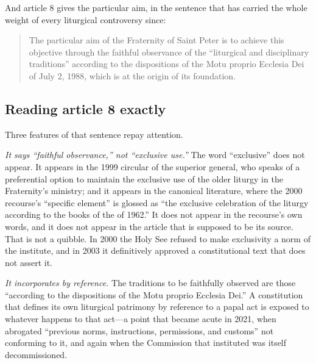 And article 8 gives the particular aim, in the sentence that has carried
the whole weight of every liturgical controversy since:

\begin{quote}\small
The particular aim of the Fraternity of Saint Peter is to achieve this
objective through the faithful observance of the ``liturgical and
disciplinary traditions'' according to the dispositions of the Motu
proprio Ecclesia Dei of July 2, 1988, which is at the origin of its
foundation.
\end{quote}

\subsection{Reading article 8 exactly}

Three features of that sentence repay attention.

\emph{It says ``faithful observance,'' not ``exclusive use.''} The word
``exclusive'' does not appear. It appears in the 1999 circular of the
superior general, who speaks of a preferential option to maintain the
exclusive use of the older liturgy in the Fraternity's ministry; and it
appears in the canonical literature, where the 2000 recourse's ``specific
element'' is glossed as ``the exclusive celebration of the liturgy
according to the books of the  of 1962.'' It does not
appear in the recourse's own words, and it does not appear in the article
that is supposed to be its source.
That is not a quibble. In 2000 the Holy See refused to make
exclusivity a norm of the institute, and in 2003 it definitively approved
a constitutional text that does not assert it.

\emph{It incorporates  by reference.} The traditions to
be faithfully observed are those ``according to the dispositions of the
Motu proprio Ecclesia Dei.'' A constitution that defines its own
liturgical patrimony by reference to a papal act is exposed to whatever
happens to that act---a point that became acute in 2021, when
 abrogated ``previous norms, instructions,
permissions, and customs'' not conforming to it, and again when the
Commission that  instituted was itself decommissioned.


